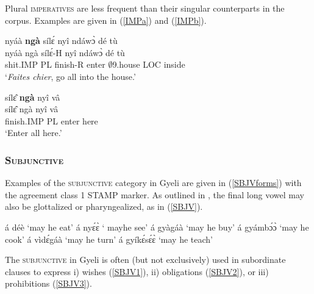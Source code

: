 Plural \textsc{imperatives} are less frequent than their singular counterparts in the corpus. Examples are given in (\ref{IMPa}) and (\ref{IMPb}). 

\begin{exe} 
\ex\label{IMPa}
  \glll nyáà {\bfseries ngà} sílɛ́ nyî ndáwɔ̀ dé tù \\
       nyáà ngà sílɛ́-H nyî ndáwɔ̀ dé tù \\
       shit.IMP PL finish-R enter $\emptyset$9.house LOC inside  \\
    \trans `{\itshape Faites chier}, go all into the house.'
\end{exe}

\begin{exe} 
\ex\label{IMPb}
  \glll sílɛ̂ {\bfseries ngà} nyî vâ \\
       sílɛ̂ ngà nyî vâ \\
        finish.IMP PL enter here \\
    \trans `Enter all here.'
\end{exe}











\subsubsection{\textsc{Subjunctive}}
\label{sec:opt}

Examples of the \textsc{subjunctive} category in Gyeli are given in (\ref{SBJVforms}) with the agreement class 1 STAMP marker. As outlined in , the final long vowel may also be glottalized or pharyngealized, as in (\ref{SBJV}).


\begin{exe}
\ex\label{SBJVforms}
\begin{xlist}
\ex á déè   `may he eat'
\ex á nyɛ́ɛ̀ ` mayhe see'
\ex á gyàgáà `may he buy' 
\ex á gyámbɔ́ɔ̀ `may he cook'
\ex á vìdɛ́gáà `may he turn'
\ex á gyíkɛ́sɛ́ɛ̀ `may he teach'
\end{xlist}
\end{exe}

The \textsc{subjunctive} in Gyeli is often (but not exclusively) used in subordinate clauses to express i) wishes (\ref{SBJV1}), ii) obligations (\ref{SBJV2}), or iii) prohibitions (\ref{SBJV3}).

